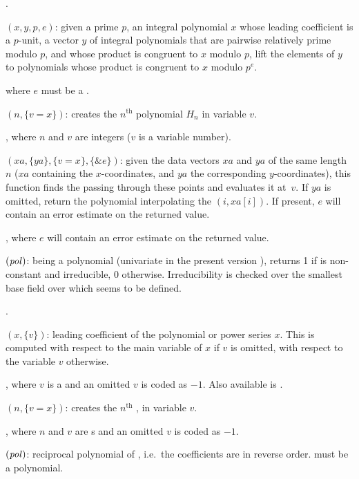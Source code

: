 .

$(x, y, p, e)$: given a prime $p$, an integral
polynomial $x$ whose leading coefficient is a $p$-unit, a vector $y$ of
integral polynomials that are pairwise relatively prime modulo $p$, and whose
product is congruent to $x$ modulo $p$, lift the elements of $y$ to
polynomials whose product is congruent to $x$ modulo $p^e$.

 where $e$ must be a .

$(n,\{v=x\})$: creates the $n^{\text{th}}$
 polynomial $H_n$ in variable $v$.

, where $n$ and $v$ are 
integers ($v$ is a variable number).

$(xa,\{ya\},\{v=x\},\{\&e\})$: given the data vectors
$xa$ and $ya$ of the same length $n$ ($xa$ containing the $x$-coordinates,
and $ya$ the corresponding $y$-coordinates), this function finds the
 passing through these points and evaluates it
at~$v$. If $ya$ is omitted, return the polynomial interpolating the
$(i,xa[i])$. If present, $e$ will contain an error estimate on the returned
value.

, where $e$ will contain an error estimate on the
returned value.

$(\hbox{\it pol\/})$:  being a polynomial
(univariate in the present version \vers), returns 1 if  is
non-constant and irreducible, 0 otherwise. Irreducibility is checked over
the smallest base field over which  seems to be defined.

.

$(x,\{v\})$: leading coefficient of the polynomial or
power series $x$. This is computed with respect to the main variable of $x$
if $v$ is omitted, with respect to the variable $v$ otherwise.

, where $v$ is a  and an omitted $v$ is coded as
$-1$. Also available is .

$(n,\{v=x\})$: creates the $n^{\text{th}}$
, in variable $v$.

, where $n$ and $v$ are s and an omitted $v$
is coded as $-1$.

$(\hbox{\it pol\/})$: reciprocal polynomial of ,
i.e.~the coefficients are in reverse order.  must be a polynomial.

